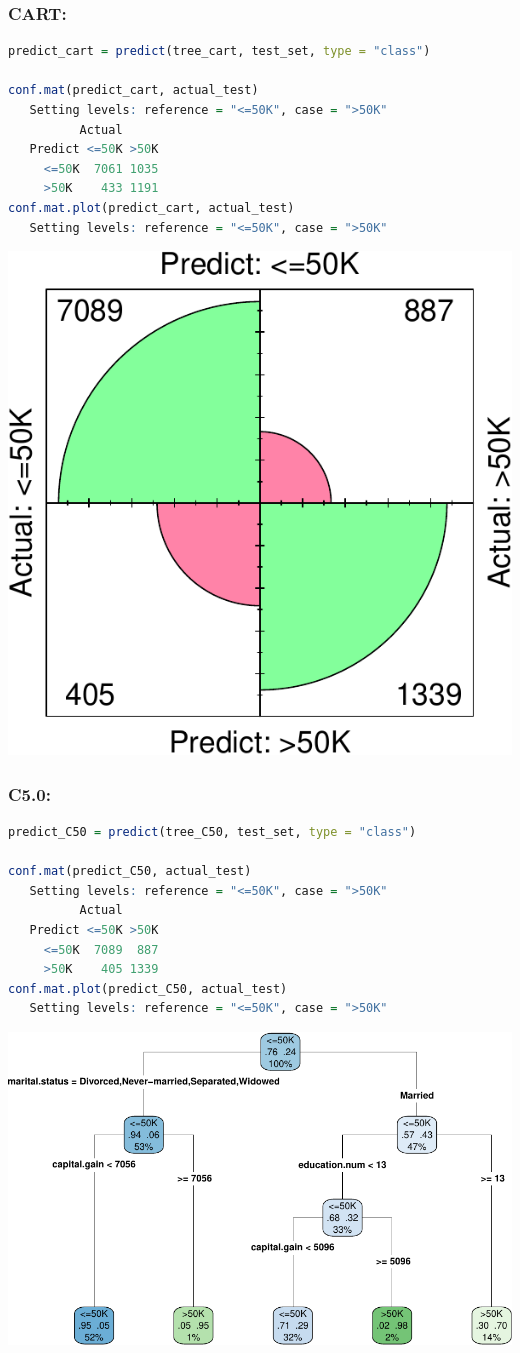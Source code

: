 \documentclass[
]{book}
\theoremstyle{definition}
\theoremstyle{definition}
\theoremstyle{definition}
\theoremstyle{definition}
\theoremstyle{remark}
\begin{document}
\subsubsection*{CART:}\label{cart}

\begin{lstlisting}[language=R]
predict_cart = predict(tree_cart, test_set, type = "class")

conf.mat(predict_cart, actual_test)
   Setting levels: reference = "<=50K", case = ">50K"
          Actual
   Predict <=50K >50K
     <=50K  7061 1035
     >50K    433 1191
conf.mat.plot(predict_cart, actual_test)
   Setting levels: reference = "<=50K", case = ">50K"
\end{lstlisting}

\begin{center}\includegraphics[width=0.3\linewidth]{tree_files/figure-latex/unnamed-chunk-11-1} \end{center}

\subsubsection*{C5.0:}\label{c5.0}

\begin{lstlisting}[language=R]
predict_C50 = predict(tree_C50, test_set, type = "class")

conf.mat(predict_C50, actual_test)
   Setting levels: reference = "<=50K", case = ">50K"
          Actual
   Predict <=50K >50K
     <=50K  7089  887
     >50K    405 1339
conf.mat.plot(predict_C50, actual_test)
   Setting levels: reference = "<=50K", case = ">50K"
\end{lstlisting}

\begin{center}\includegraphics[width=0.3\linewidth]{tree_files/figure-latex/unnamed-chunk-12-1} \end{center}
\end{document}
